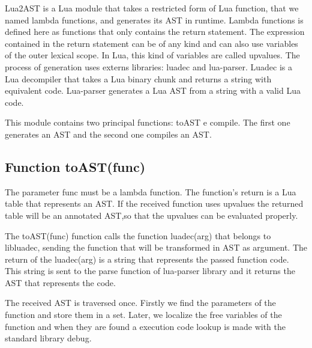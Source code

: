 \documentclass[english]{llncs}
\begin{document}
Lua2AST is a Lua module that takes a restricted form of Lua function, that we named lambda functions, and generates its AST in runtime.
Lambda functions is defined here as functions that only contains the return statement.
The expression contained in the return statement can be of any kind and can also use variables of the outer lexical scope.
In Lua, this kind of variables are called upvalues.
The process of generation uses externs libraries: luadec and lua-parser.
Luadec \cite{LuaDec} is a Lua decompiler that takes a Lua binary chunk and returns a string with equivalent code.
Lua-parser \cite{lua-parser} generates a Lua AST from a string with a valid Lua code.

This module contains two principal functions: toAST e compile.
The first one generates an AST and the second one compiles an AST.

\subsection{Function toAST(func) }

The parameter func must be a lambda function.
The function's return is a Lua table that represents an AST.
If the received function uses upvalues the returned table will be an annotated AST,so that the upvalues can be evaluated properly.

The toAST(func) function calls the function luadec(arg) that belongs to libluadec, sending the function that will be transformed in AST as argument.
The return of the luadec(arg) is a string that represents the passed function code.
This string is sent to the parse function of lua-parser library and it returns the AST that represents the code.

The received AST is traversed once.
Firstly we find the parameters of the function and store them in a set.
Later, we localize the free variables of the  function and when they are found a execution code lookup is made with the standard library debug.
\end{document}
